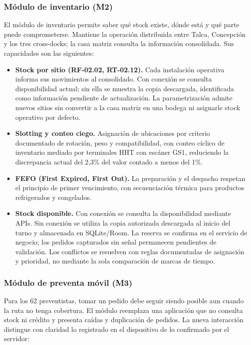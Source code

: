 \subsubsection{Módulo de inventario (M2)}

El módulo de inventario permite saber qué stock existe, dónde está y qué parte puede comprometerse. Mantiene la operación distribuida entre Talca, Concepción y los tres cross-docks; la casa matriz consulta la información consolidada. Sus capacidades son las siguientes:

\begin{itemize}
  \item \textbf{Stock por sitio (RF-02.02, RT-02.12).} Cada instalación operativa informa sus movimientos al consolidado. Con conexión se consulta disponibilidad actual; sin ella se muestra la copia descargada, identificada como información pendiente de actualización. La parametrización admite nuevos sitios sin convertir a la casa matriz en una bodega ni asignarle stock operativo por defecto.
  \item \textbf{Slotting y conteo ciego.} Asignación de ubicaciones por criterio documentado de rotación, peso y compatibilidad, con conteo cíclico de inventario mediado por terminales HHT con escáner GS1, reduciendo la discrepancia actual del 2,3\% del valor contado a menos del 1\%.
  \item \textbf{FEFO (First Expired, First Out).} La preparación y el despacho respetan el principio de primer vencimiento, con secuenciación térmica para productos refrigerados y congelados.
  \item \textbf{Stock disponible.} Con conexión se consulta la disponibilidad mediante APIs. Sin conexión se utiliza la copia autorizada descargada al inicio del turno y almacenada en SQLite/Room. La reserva se confirma en el servicio de negocio; los pedidos capturados sin señal permanecen pendientes de validación. Los conflictos se resuelven con reglas documentadas de asignación y prioridad, no mediante la sola comparación de marcas de tiempo.
\end{itemize}

\subsubsection{Módulo de preventa móvil (M3)}

Para los 62 preventistas, tomar un pedido debe seguir siendo posible aun cuando la ruta no tenga cobertura. El módulo reemplaza una aplicación que no consulta stock ni crédito y presenta caídas y duplicación de pedidos. La nueva interacción distingue con claridad lo registrado en el dispositivo de lo confirmado por el servidor:

